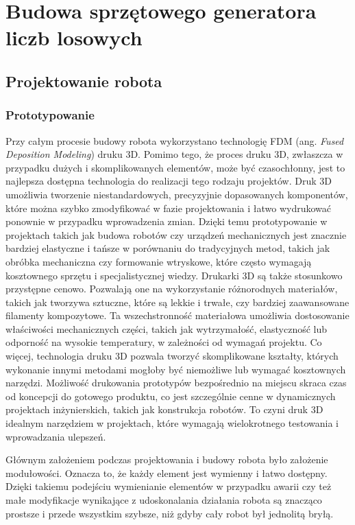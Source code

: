 
\chapter{Budowa sprzętowego generatora liczb losowych}\label{ch:budowa-sprzetowego-generatora}


\section{Projektowanie robota}\label{sec:projektowanie-robota}

\subsection{Prototypowanie}\label{subsec:prototypowanie}

Przy całym procesie budowy robota wykorzystano technologię FDM (ang. \textit{Fused Deposition Modeling}) druku 3D. Pomimo tego, że proces druku 3D, zwłaszcza w przypadku dużych i skomplikowanych elementów, może być czasochłonny, jest to najlepsza dostępna
technologia do realizacji tego rodzaju projektów. Druk 3D umożliwia tworzenie niestandardowych, precyzyjnie dopasowanych komponentów, które można 
szybko zmodyfikować w fazie projektowania i łatwo wydrukować ponownie w przypadku wprowadzenia zmian. Dzięki temu prototypowanie w projektach takich 
jak budowa robotów czy urządzeń mechanicznych jest znacznie bardziej elastyczne i tańsze w porównaniu do tradycyjnych metod, takich jak obróbka 
mechaniczna czy formowanie wtryskowe, które często wymagają kosztownego sprzętu i specjalistycznej wiedzy.
Drukarki 3D są także stosunkowo przystępne cenowo. Pozwalają one na wykorzystanie różnorodnych materiałów, takich jak tworzywa sztuczne, które są lekkie 
i trwałe, czy bardziej zaawansowane filamenty kompozytowe. Ta wszechstronność materiałowa umożliwia dostosowanie właściwości mechanicznych części, takich 
jak wytrzymałość, elastyczność lub odporność na wysokie temperatury, w zależności od wymagań projektu.
Co więcej, technologia druku 3D pozwala tworzyć skomplikowane kształty, których wykonanie innymi metodami mogłoby być niemożliwe lub wymagać kosztownych 
narzędzi. Możliwość drukowania prototypów bezpośrednio na miejscu skraca czas od koncepcji do gotowego produktu, co jest szczególnie cenne w dynamicznych 
projektach inżynierskich, takich jak konstrukcja robotów. To czyni druk 3D idealnym narzędziem w projektach, które wymagają wielokrotnego 
testowania i wprowadzania ulepszeń.

Głównym założeniem podczas projektowania i budowy robota było założenie modułowości. Oznacza to, że każdy element jest wymienny i łatwo dostępny.
Dzięki takiemu podejściu wymienianie elementów w przypadku awarii czy też małe modyfikacje wynikające z udoskonalania działania robota
są znacząco prostsze i przede wszystkim szybsze, niż gdyby cały robot był jednolitą bryłą.

